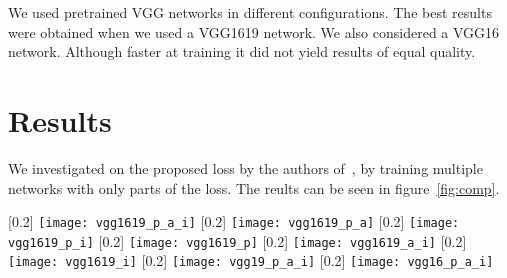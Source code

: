 \documentclass[10pt,twocolumn,letterpaper]{article}
\begin{document}
We used pretrained VGG networks in different configurations. The best
results were obtained when we used a VGG1619 network. We also
considered a VGG16 network. Although faster at training it did not
yield results of equal quality.


\section{Results}
\label{sec:results}


We investigated on the proposed loss by the authors
of~\cite{LedigChristian2016PSIS}, by training multiple networks with
only parts of the loss. The reults can be seen in figure~\ref{fig:comp}.


\begin{figure*}[h]
  \centering
  [0.2\linewidth]{%
    \texttt{[image: vgg1619\_p\_a\_i]}
  }
  [0.2\linewidth]{%
    \texttt{[image: vgg1619\_p\_a]}
  }
  [0.2\linewidth]{%
    \texttt{[image: vgg1619\_p\_i]}
  }
  [0.2\linewidth]{%
    \texttt{[image: vgg1619\_p]}
  }
  [0.2\linewidth]{%
    \texttt{[image: vgg1619\_a\_i]}
  }
  [0.2\linewidth]{%
    \texttt{[image: vgg1619\_i]}
  }
  [0.2\linewidth]{%
    \texttt{[image: vgg19\_p\_a\_i]}
  }
  [0.2\linewidth]{%
    \texttt{[image: vgg16\_p\_a\_i]}
  }
  \caption{Comparison of several loss configurations}
  \label{fig:comp}
\end{figure*}
\end{document}
